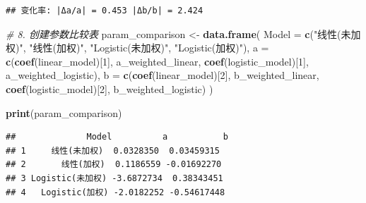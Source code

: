 \documentclass[
]{article}
\newenvironment{Shaded}{\begin{snugshade}}{\end{snugshade}}
\newcommand{\AttributeTok}[1]{\textcolor[rgb]{0.13,0.29,0.53}{#1}}
\newcommand{\CommentTok}[1]{\textcolor[rgb]{0.56,0.35,0.01}{\textit{#1}}}
\newcommand{\DecValTok}[1]{\textcolor[rgb]{0.00,0.00,0.81}{#1}}
\newcommand{\FunctionTok}[1]{\textcolor[rgb]{0.13,0.29,0.53}{\textbf{#1}}}
\newcommand{\NormalTok}[1]{#1}
\newcommand{\OtherTok}[1]{\textcolor[rgb]{0.56,0.35,0.01}{#1}}
\newcommand{\StringTok}[1]{\textcolor[rgb]{0.31,0.60,0.02}{#1}}
\begin{document}
\begin{verbatim}
## 变化率: |Δa/a| = 0.453 |Δb/b| = 2.424
\end{verbatim}

\begin{Shaded}
\begin{Highlighting}[]
\CommentTok{\# 8. 创建参数比较表}
\NormalTok{param\_comparison }\OtherTok{\textless{}{-}} \FunctionTok{data.frame}\NormalTok{(}
  \AttributeTok{Model =} \FunctionTok{c}\NormalTok{(}\StringTok{"线性(未加权)"}\NormalTok{, }\StringTok{"线性(加权)"}\NormalTok{, }\StringTok{"Logistic(未加权)"}\NormalTok{, }\StringTok{"Logistic(加权)"}\NormalTok{),}
  \AttributeTok{a =} \FunctionTok{c}\NormalTok{(}\FunctionTok{coef}\NormalTok{(linear\_model)[}\DecValTok{1}\NormalTok{], a\_weighted\_linear, }
        \FunctionTok{coef}\NormalTok{(logistic\_model)[}\DecValTok{1}\NormalTok{], a\_weighted\_logistic),}
  \AttributeTok{b =} \FunctionTok{c}\NormalTok{(}\FunctionTok{coef}\NormalTok{(linear\_model)[}\DecValTok{2}\NormalTok{], b\_weighted\_linear, }
        \FunctionTok{coef}\NormalTok{(logistic\_model)[}\DecValTok{2}\NormalTok{], b\_weighted\_logistic)}
\NormalTok{)}

\FunctionTok{print}\NormalTok{(param\_comparison)}
\end{Highlighting}
\end{Shaded}

\begin{verbatim}
##              Model          a           b
## 1     线性(未加权)  0.0328350  0.03459315
## 2       线性(加权)  0.1186559 -0.01692270
## 3 Logistic(未加权) -3.6872734  0.38343451
## 4   Logistic(加权) -2.0182252 -0.54617448
\end{verbatim}
\end{document}
